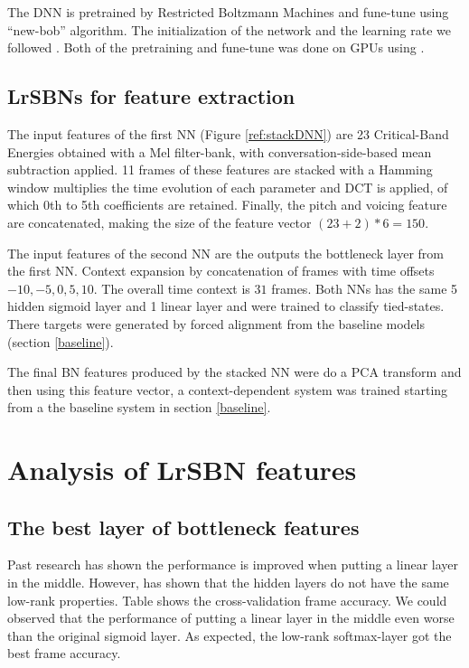 \documentclass{article}
\begin{document}
The DNN is pretrained by Restricted Boltzmann Machines \cite{RBM} and fune-tune using ``new-bob'' algorithm. The initialization of the network and the learning rate we followed \cite{kaldiDNN}. Both of the pretraining and fune-tune was done on GPUs using \cite{Kaldi}.

\subsection{LrSBNs for feature extraction}

The input features of the first NN (Figure \ref{ref:stackDNN}) are 23 Critical-Band Energies obtained with a Mel filter-bank, with conversation-side-based mean subtraction applied. 11 frames of these features are stacked with a Hamming window multiplies the time evolution of each parameter and DCT is applied, of which 0th to 5th coefficients are retained\cite{Martin2013}. Finally, the pitch and voicing feature are concatenated, making the size of the feature vector
$(23+2)*6 = 150$.

The input features of the second NN are the outputs the bottleneck layer from the first NN. Context expansion by concatenation of frames with time offsets $-10,-5,0,5,10$. The overall time context is $31$ frames. Both NNs has the same 5 hidden sigmoid layer and 1 linear layer and were trained to classify tied-states. There targets were generated by forced alignment from the baseline models (section \ref{baseline}).

The final BN features produced by the stacked NN were do a PCA transform and then using this feature vector, a context-dependent system was trained starting from a the baseline system in section \ref{baseline}.

\section{Analysis of LrSBN features}

\subsection{The best layer of bottleneck features}
Past research \cite{Martin2013} has shown the performance is improved when putting a linear layer in the middle. However, \cite{Tara2013} has shown that the hidden layers do not have the same low-rank properties. Table  shows the cross-validation frame accuracy. We could observed that the performance of putting a linear layer in the middle even worse than the original sigmoid layer. As expected, the low-rank softmax-layer got the best frame accuracy.
\end{document}
